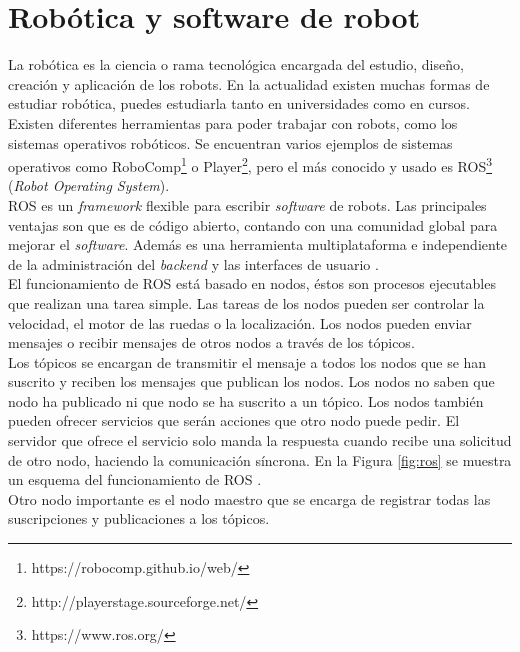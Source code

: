 \section{Robótica y software de robot}
La robótica es la ciencia o rama tecnológica encargada del estudio, diseño, creación y aplicación de los robots. En la actualidad existen muchas formas de estudiar robótica, puedes estudiarla tanto en universidades como en cursos. Existen diferentes herramientas para poder trabajar con robots, como los sistemas operativos robóticos. Se encuentran varios ejemplos de sistemas operativos como RoboComp\footnote{https://robocomp.github.io/web/} o Player\footnote{http://playerstage.sourceforge.net/}, pero el más conocido y usado es ROS\footnote{https://www.ros.org/} (\textit{Robot Operating System}).\\

ROS  es un \textit{framework} flexible para escribir \textit{software} de robots. Las principales ventajas son que es de código abierto, contando con una comunidad global para mejorar el \textit{software}. Además es una herramienta multiplataforma e independiente de la administración del \textit{backend} y las interfaces de usuario \cite{ros}.\\

El funcionamiento de ROS está basado en nodos, éstos son procesos ejecutables que realizan una tarea simple. Las tareas de los nodos pueden ser controlar la velocidad, el motor de las ruedas o la localización. Los nodos pueden enviar mensajes o recibir mensajes de otros nodos a través de los tópicos. \\

Los tópicos se encargan de transmitir el mensaje a todos los nodos que se han suscrito y reciben los mensajes que publican los nodos. Los nodos no saben que nodo ha publicado ni que nodo se ha suscrito a un tópico. Los nodos también pueden ofrecer servicios que serán acciones que otro nodo puede pedir. El servidor que ofrece el servicio solo manda la respuesta cuando recibe una solicitud de otro nodo, haciendo la comunicación síncrona. En la Figura \ref{fig:ros} se muestra un esquema del funcionamiento de ROS \cite{ros2}.\\

Otro nodo importante es el nodo maestro que se encarga de registrar todas las suscripciones y publicaciones a los tópicos.\\

